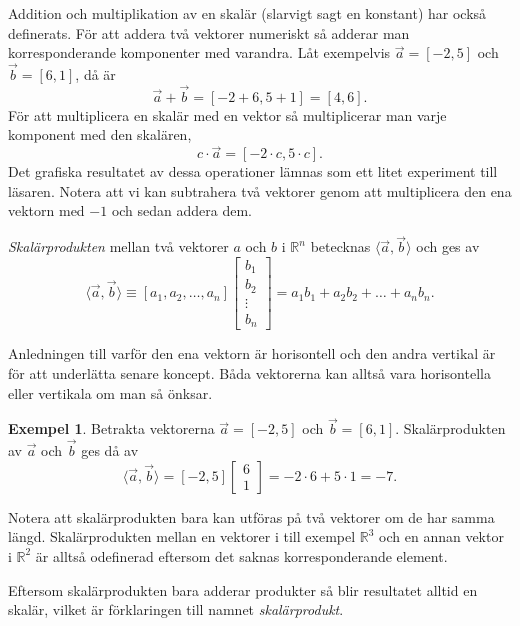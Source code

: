 \documentclass{article}
\theoremstyle{definition}
\newtheorem{exmp}[thm]{Exempel}
\begin{document}
Addition och multiplikation av en skalär (slarvigt sagt en konstant) 
har också definerats.
För att addera två vektorer numeriskt så adderar 
man korresponderande komponenter med varandra. 
Låt exempelvis $\vec{a} = [-2, 5]$ och $\vec{b} = [6, 1]$, 
då är 
\[\vec{a} + \vec{b} = [-2 + 6, 5 + 1] = [4, 6].\]
För att multiplicera en skalär
med en vektor så multiplicerar man varje komponent med den skalären,
\[c \cdot \vec{a} = [-2 \cdot c, 5 \cdot c].\]
Det grafiska resultatet av dessa operationer lämnas som ett 
litet experiment till läsaren. 
Notera att vi kan subtrahera två vektorer genom att multiplicera den ena vektorn med 
$-1$ och sedan addera dem. 
\begin{mydef}{}{}
  \textit{Skalärprodukten} mellan två vektorer $a$ och $b$ i $\mathbb{R}^n$ 
  betecknas $\langle \vec{a}, \vec{b} \rangle$ och ges av
  \[\langle \vec{a}, \vec{b} \rangle \equiv [a_1, a_2, \ldots, a_n] 
  \begin{bmatrix}
    b_1 \\
    b_2 \\
    \vdots \\
    b_n
  \end{bmatrix} = a_1 b_1 + a_2 b_2 + \ldots + a_n b_n.
  \]
\end{mydef}
Anledningen till varför den ena vektorn är horisontell och den andra vertikal är för att 
underlätta senare koncept. Båda vektorerna kan alltså vara horisontella eller vertikala 
om man så önksar. 
\begin{exmp}
  Betrakta vektorerna $\vec{a} = [-2, 5]$ och $\vec{b} = [6, 1]$. 
  Skalärprodukten av $\vec{a}$ och $\vec{b}$ ges då av
  \[\langle \vec{a}, \vec{b} \rangle = [-2, 5] 
\begin{bmatrix}
  6 \\
  1
\end{bmatrix} = -2 \cdot 6 + 5 \cdot 1 = -7.
\]  
\end{exmp}

Notera att skalärprodukten bara kan utföras på två vektorer om de har samma längd. 
Skalärprodukten mellan en vektorer i till exempel $\mathbb{R}^3$ och en annan vektor i $\mathbb{R}^2$
är alltså odefinerad eftersom det saknas korresponderande element. 

Eftersom skalärprodukten bara adderar produkter så blir resultatet alltid en skalär, vilket 
är förklaringen till namnet \textit{skalärprodukt}. 
\end{document}
